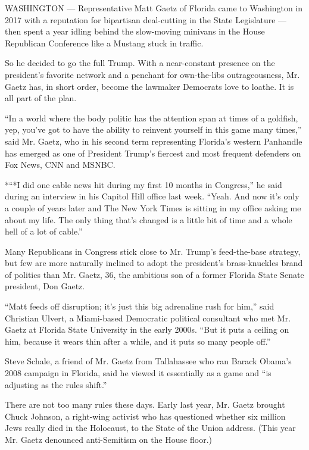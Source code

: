 WASHINGTON --- Representative Matt Gaetz of Florida came to Washington
in 2017 with a reputation for bipartisan deal-cutting in the State
Legislature --- then spent a year idling behind the slow-moving minivans
in the House Republican Conference like a Mustang stuck in traffic.

So he decided to go the full Trump. With a near-constant presence on the
president's favorite network and a penchant for own-the-libs
outrageousness, Mr. Gaetz has, in short order, become the lawmaker
Democrats love to loathe. It is all part of the plan.

``In a world where the body politic has the attention span at times of a
goldfish, yep, you've got to have the ability to reinvent yourself in
this game many times,'' said Mr. Gaetz, who in his second term
representing Florida's western Panhandle has emerged as one of President
Trump's fiercest and most frequent defenders on Fox News, CNN and MSNBC.

*``*I did one cable news hit during my first 10 months in Congress,'' he
said during an interview in his Capitol Hill office last week. ``Yeah.
And now it's only a couple of years later and The New York Times is
sitting in my office asking me about my life. The only thing that's
changed is a little bit of time and a whole hell of a lot of cable.''

Many Republicans in Congress stick close to Mr. Trump's feed-the-base
strategy, but few are more naturally inclined to adopt the president's
brass-knuckles brand of politics than Mr. Gaetz, 36, the ambitious son
of a former Florida State Senate president, Don Gaetz.

``Matt feeds off disruption; it's just this big adrenaline rush for
him,'' said Christian Ulvert, a Miami-based Democratic political
consultant who met Mr. Gaetz at Florida State University in the early
2000s. ``But it puts a ceiling on him, because it wears thin after a
while, and it puts so many people off.''

Steve Schale, a friend of Mr. Gaetz from Tallahassee who ran Barack
Obama's 2008 campaign in Florida, said he viewed it essentially as a
game and ``is adjusting as the rules shift.''

There are not too many rules these days. Early last year, Mr. Gaetz
brought Chuck Johnson, a right-wing activist who has questioned whether
six million Jews really died in the Holocaust, to the State of the Union
address. (This year Mr. Gaetz denounced anti-Semitism on the House
floor.)

